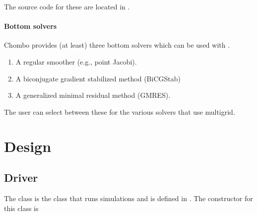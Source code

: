 \documentclass[letterpaper,10pt,english]{sphinxmanual}
\begin{document}
\sphinxAtStartPar
The source code for these are located in .


\subsubsection{Bottom solvers}
\label{\detokenize{Source/LinearSolvers:bottom-solvers}}
\sphinxAtStartPar
Chombo provides (at least) three bottom solvers which can be used with .
\begin{enumerate}
%
\item {} 
\sphinxAtStartPar
A regular smoother (e.g., point Jacobi).

\item {} 
\sphinxAtStartPar
A biconjugate gradient stabilized method (BiCGStab)

\item {} 
\sphinxAtStartPar
A generalized minimal residual method (GMRES).

\end{enumerate}

\sphinxAtStartPar
The user can select between these for the various solvers that use multigrid.


\chapter{Design}
\label{\detokenize{index:design}}
\sphinxstepscope


\section{Driver}
\label{\detokenize{Source/Driver:driver}}\label{\detokenize{Source/Driver:chap-driver}}\label{\detokenize{Source/Driver::doc}}
\sphinxAtStartPar
The  class is the class that runs  simulations and is defined in .
The constructor for this class is
\end{document}
